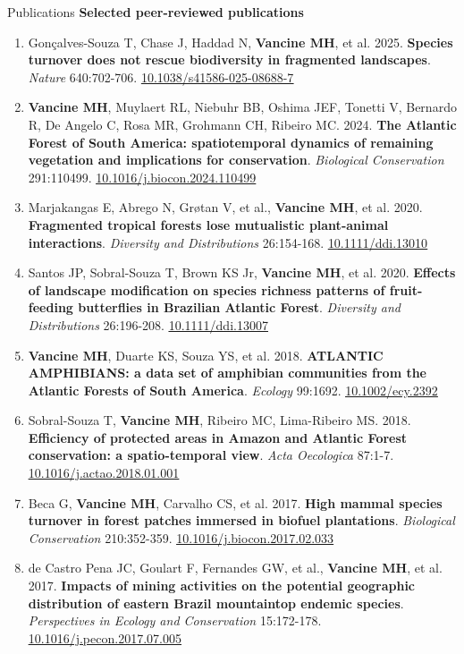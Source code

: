 \documentclass{resume}
\begin{document}
\begin{rSection}{Publications}
\textbf{Selected peer-reviewed publications}
\begin{enumerate}
\item Gonçalves-Souza T, Chase J, Haddad N, \textbf{Vancine MH}, et al. 2025. \textbf{Species turnover does not rescue biodiversity in fragmented landscapes}. \textit{Nature} 640:702-706. \href{https://doi.org/10.1038/s41586-025-08688-7}{\underline{10.1038/s41586-025-08688-7}}
\item \textbf{Vancine MH}, Muylaert RL, Niebuhr BB, Oshima JEF, Tonetti V, Bernardo R, De Angelo C, Rosa MR, Grohmann CH, Ribeiro MC. 2024. \textbf{The Atlantic Forest of South America: spatiotemporal dynamics of remaining vegetation and implications for conservation}. \textit{Biological Conservation} 291:110499. \href{https://doi.org/10.1016/j.biocon.2024.110499}{\underline{10.1016/j.biocon.2024.110499}}
\item Marjakangas E, Abrego N, Grøtan V, et al., \textbf{Vancine MH}, et al. 2020. \textbf{Fragmented tropical forests lose mutualistic plant-animal interactions}. \textit{Diversity and Distributions} 26:154-168. \href{https://doi.org/10.1111/ddi.13010}{\underline{10.1111/ddi.13010}}
\item Santos JP, Sobral-Souza T, Brown KS Jr, \textbf{Vancine MH}, et al. 2020. \textbf{Effects of landscape modification on species richness patterns of fruit-feeding butterflies in Brazilian Atlantic Forest}. \textit{Diversity and Distributions} 26:196-208. \href{https://doi.org/10.1111/ddi.13007}{\underline{10.1111/ddi.13007}}
\item \textbf{Vancine MH}, Duarte KS, Souza YS, et al. 2018. \textbf{ATLANTIC AMPHIBIANS: a data set of amphibian communities from the Atlantic Forests of South America}. \textit{Ecology} 99:1692. \href{https://doi.org/10.1002/ecy.2392}{\underline{10.1002/ecy.2392}}
\item Sobral-Souza T, \textbf{Vancine MH}, Ribeiro MC, Lima-Ribeiro MS. 2018. \textbf{Efficiency of protected areas in Amazon and Atlantic Forest conservation: a spatio-temporal view}. \textit{Acta Oecologica} 87:1-7. \href{https://doi.org/10.1016/j.actao.2018.01.001}{\underline{10.1016/j.actao.2018.01.001}}
\item Beca G, \textbf{Vancine MH}, Carvalho CS, et al. 2017. \textbf{High mammal species turnover in forest patches immersed in biofuel plantations}. \textit{Biological Conservation} 210:352-359. \href{https://doi.org/10.1016/j.biocon.2017.02.033}{\underline{10.1016/j.biocon.2017.02.033}}
\item de Castro Pena JC, Goulart F, Fernandes GW, et al., \textbf{Vancine MH}, et al. 2017. \textbf{Impacts of mining activities on the potential geographic distribution of eastern Brazil mountaintop endemic species}. \textit{Perspectives in Ecology and Conservation} 15:172-178. \href{https://doi.org/10.1016/j.pecon.2017.07.005}{\underline{10.1016/j.pecon.2017.07.005}}
\end{enumerate}


\end{rSection}
\end{document}
